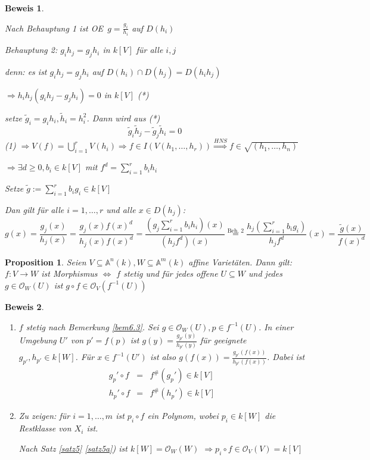 \documentclass[a4paper, 12pt, numbers=noendperiod, chapterprefix=true, headsepline]{scrbook}
\theoremstyle{break}
\newtheorem{Prop}[Def]{Proposition}
\theoremstyle{nonumberbreak}
\newtheorem{Bew}{Beweis}
\theoremstyle{nonumberplain}
\newcommand{\quot}[1]{\textrm{\glqq}{#1}\textrm{\grqq}}
\newenvironment{twosidedproof}{\begin{enumerate}[\quot{$\Rightarrow$}:]}{\end{enumerate}}
\newcommand{\proofforward}{\item[\quot{$\Rightarrow$}:]}
\newcommand{\proofreverse}{\item[\quot{$\Leftarrow$}:]}
\newcommand{\A}{\mathbb{A}}
\newcommand{\calO}{\mathcal{O}}
\renewcommand{\OE}{O\!\!E~}
\begin{document}
\begin{Bew}
\begin{enumerate}[a)]
\begin{description}[\setlabelstyle{\itshape}]
	Nach Behauptung 1 ist \OE $ g= \frac{g_i}{h_i}$ auf $D(h_i)$
	
	\emph{Behauptung 2:} $g_i h_j = g_j h_i$ in $k[V]$ f\"ur alle $i,j$
	
	\emph{denn:} es ist $g_ih_j = g_jh_i$ auf $D(h_i)\cap D(h_j)=D(h_ih_j)$
	
	$\Rightarrow h_ih_j(g_ih_j-g_jh_i)=0$ in $k[V]$ (*)
	
	setze $\tilde g_i = g_ih_i, \tilde h_i = h_i^2$. Dann wird aus (*)
		\[\tilde g_i \tilde h_j -\tilde g_j \tilde h_i =0\]
	(1) $\Rightarrow V(f) =\bigcup_{i=1}^r V(h_i) \Rightarrow f \in I(V(h_1,\dots ,h_r)) \stackrel{HNS}{\Rightarrow } f\in \sqrt{(h_1,\dots ,h_n)}$
	
	$\Rightarrow \exists d\geq 0, b_i\in k[V]$ mit $f^d=\sum_{i=1}^rb_ih_i$
	
	Setze $\tilde g := \sum_{i=1}^rb_ig_i\in k[V]$
	
	Dan gilt f\"ur alle $i=1,\dots ,r$ und alle $x\in D(h_j)$:
		\[g(x)=\frac{g_j(x)}{h_j(x)}=\frac{g_j(x)f(x)^d}{h_j(x)f(x)^d}=\frac{(g_j\sum_{i=1}^rb_ih_i)(x)}{(h_jf^d)(x)} \stackrel{\textrm{Beh. 2}}{=} \frac{h_j(\sum_{i=1}^rb_ig_i)}{h_jf^d}(x) = \frac{\tilde g(x)}{f(x)^d}\]
\end{description}
\end{enumerate}\end{Bew}

\begin{Prop}
Seien $V\subseteq\A^n(k), W\subseteq \A^m(k)$ affine Variet\"aten. Dann gilt: $f:V\to W$ ist Morphismus $\Leftrightarrow$ $f$ stetig und f\"ur jedes offene $U\subseteq W$ und jedes $g\in \calO_W(U)$ ist $g\circ f\in \calO_V(f^{-1}(U))$
\end{Prop}

\begin{Bew}\begin{twosidedproof}
\proofforward
	$f$ stetig nach Bemerkung \ref{bem6.3}. Sei $g\in \calO_W(U), p \in f^{-1}(U)$. In einer Umgebung $U'$ von $p'=f(p)$ ist $g(y)=\frac{g_{p'}(y)}{h_{p'}(y)}$ f\"ur geeignete $g_{p'}, h_{p'}\in k[W]$.	F\"ur $x\in f^{-1}(U')$ ist also $g(f(x))=\frac{g_{p'}(f(x))}{h_{p'}(f(x))}$. Dabei ist\[\begin{array}{lcr}
		g_p'\circ f & = & f^{\#}(g_p')\in k[V]\\
		h_p'\circ f & = & f^{\#}(h_p')\in k[V]\end{array}\]
\proofreverse
	Zu zeigen: f\"ur $i=1,\dots ,m$ ist $p_i\circ f$ ein Polynom, wobei $p_i\in k[W]$ die Restklasse von $X_i$ ist.
	
	Nach Satz \ref{satz5} \ref{satz5a}) ist $k[W] = \calO_W(W)$ $\Rightarrow p_i\circ f\in \calO_V(V)=k[V]$
\end{twosidedproof}\end{Bew}
\end{document}
